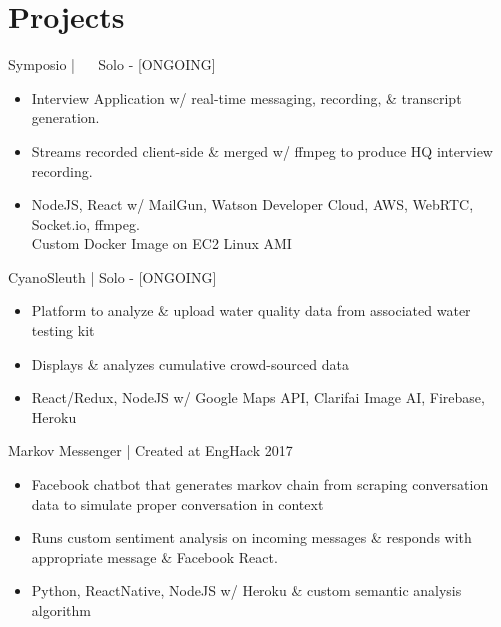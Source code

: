 \documentclass[]{friggeri-cv}
\begin{document}
\section{Projects}

\begin{entrylist}
	\entry
	{Symposio | \href{https://github.com/suzyng83209/symposio}{\faGithub} \ \ \href{http://symposiostream}{\faLink}}
	{\vspace{0.5\parsep}Solo - [ONGOING]}
	{
		\begin{itemize}[leftmargin=*]
			\vspace{-0.4cm}
			\item Interview Application w/ real-time messaging, recording, \& transcript generation.
			\item Streams recorded client-side \& merged w/ ffmpeg to produce HQ interview recording.
			\item NodeJS, React w/ MailGun, Watson Developer Cloud, AWS, WebRTC, Socket.io, ffmpeg. \\ Custom Docker Image on EC2 Linux AMI  
		\end{itemize}
	}
	\entry
	{CyanoSleuth | \href{https://github.com/suzyng83209/cyanosleuth}{\faGithub}}
	{\vspace{0.5\parsep}Solo - [ONGOING]}
	{
		\begin{itemize}[leftmargin=*]
			\vspace{-0.4cm}
			\item Platform to analyze \& upload water quality data from associated water testing kit
			\item Displays \& analyzes cumulative crowd-sourced data
			\item React/Redux, NodeJS w/ Google Maps API, Clarifai Image AI, Firebase, Heroku
		\end{itemize}
	}
	\entry
	{Markov Messenger | \href{https://github.com/suzyng83209/markov-messenger-bot}{\faGithub}}
	{\vspace{0.5\parsep}Created at EngHack 2017}
	{
		\begin{itemize}[leftmargin=*]
			\vspace{-0.4cm}
			\item Facebook chatbot that generates markov chain from scraping conversation data to simulate proper conversation in context
			\item Runs custom sentiment analysis on incoming messages \& responds with appropriate message \& Facebook React.\
			\item Python, ReactNative, NodeJS w/ Heroku \& custom semantic analysis algorithm

\end{itemize}}
\end{entrylist}
\end{document}

